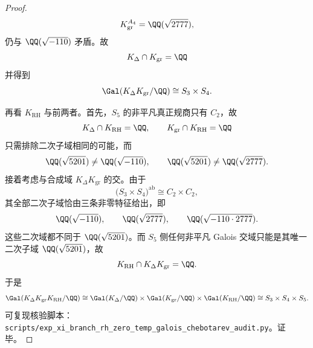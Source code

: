 \begin{proof}
\[
K_{\mathrm{gr}}^{A_4}=\QQ(\sqrt{2777}),
\]
仍与 \(\QQ(\sqrt{-110})\) 矛盾。故
\[
K_\Delta\cap K_{\mathrm{gr}}=\QQ
\]
并得到
\[
\Gal(K_\Delta K_{\mathrm{gr}}/\QQ)\cong S_3\times S_4.
\]
\par
再看 \(K_{\mathrm{RH}}\) 与前两者。首先，\(S_5\) 的非平凡真正规商只有 \(C_2\)，故
\[
K_\Delta\cap K_{\mathrm{RH}}=\QQ,
\qquad
K_{\mathrm{gr}}\cap K_{\mathrm{RH}}=\QQ
\]
只需排除二次子域相同的可能，而
\[
\QQ(\sqrt{5201})
\neq
\QQ(\sqrt{-110}),
\qquad
\QQ(\sqrt{5201})
\neq
\QQ(\sqrt{2777}).
\]
接着考虑与合成域 \(K_\Delta K_{\mathrm{gr}}\) 的交。由于
\[
\bigl(S_3\times S_4\bigr)^{\mathrm{ab}}\cong C_2\times C_2,
\]
其全部二次子域恰由三条非零特征给出，即
\[
\QQ(\sqrt{-110}),\qquad
\QQ(\sqrt{2777}),\qquad
\QQ(\sqrt{-110\cdot 2777}).
\]
这些二次域都不同于 \(\QQ(\sqrt{5201})\)。而 \(S_5\) 侧任何非平凡 Galois 交域只能是其唯一二次子域 \(\QQ(\sqrt{5201})\)，故
\[
K_{\mathrm{RH}}\cap K_\Delta K_{\mathrm{gr}}=\QQ.
\]
于是
\[
\Gal(K_\Delta K_{\mathrm{gr}}K_{\mathrm{RH}}/\QQ)
\cong
\Gal(K_\Delta/\QQ)\times\Gal(K_{\mathrm{gr}}/\QQ)\times\Gal(K_{\mathrm{RH}}/\QQ)
\cong
S_3\times S_4\times S_5.
\]
可复现核验脚本：\texttt{scripts/exp\_xi\_branch\_rh\_zero\_temp\_galois\_chebotarev\_audit.py}。证毕。
\end{proof}

